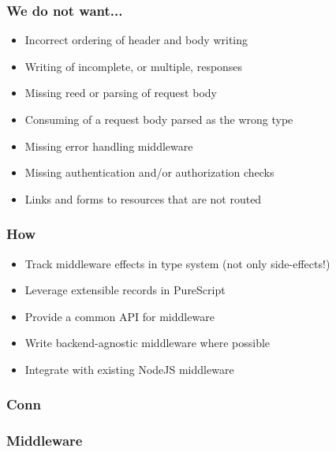 \begin{frame}
  \frametitle{We do not want...}
  \begin{itemize}
    \pause
    \item<+-> Incorrect ordering of header and body writing
    \item<+-> Writing of incomplete, or multiple, responses
    \item<+-> Missing reed or parsing of request body
    \item<+-> Consuming of a request body parsed as the wrong type
    \item<+-> Missing error handling middleware
    \item<+-> Missing authentication and/or authorization checks
    \item<+-> Links and forms to resources that are not routed
  \end{itemize}
\end{frame}

\begin{frame}
  \frametitle{How}
  \begin{itemize}
    \item<+-> Track middleware effects in type system (not only side-effects!)
    \item<+-> Leverage extensible records in PureScript
    \item<+-> Provide a common API for middleware
    \item<+-> Write backend-agnostic middleware where possible
    \item<+-> Integrate with existing NodeJS middleware
  \end{itemize}
\end{frame}

\begin{frame}
\end{frame}

\begin{frame}
  \frametitle{Conn}
  
\end{frame}


\begin{frame}
  \frametitle{Middleware}
  
\end{frame}

